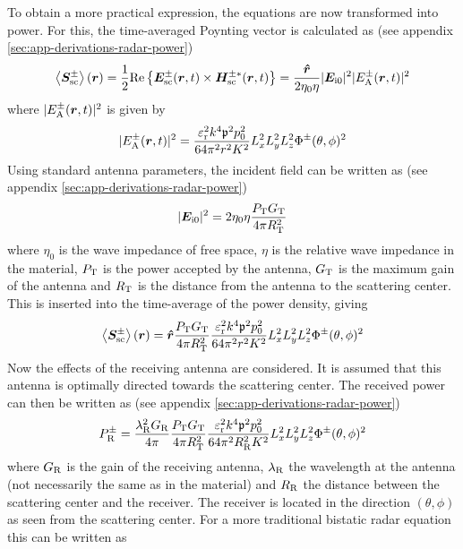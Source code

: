 \documentclass[11pt,twoside]{eitExjobb}
\begin{document}
	To obtain a more practical expression, the equations are now transformed into power. For this, the time-averaged Poynting vector is calculated as (see appendix \ref{sec:app-derivations-radar-power})
	\begin{equation*}
		\left< \bm{S}_{\mathrm{sc}}^\pm \right> (\bm{r}) = \frac{1}{2}\mathrm{Re}\left\{ \bm{E}_{\mathrm{sc}}^\pm (\bm{r},t) \times \bm{H}_{\mathrm{sc}}^{\pm*} (\bm{r},t) \right\} = \frac{\bm{\hat{r}}}{2\eta_0 \eta} |\bm{E}_{\mathrm{i}0}|^2 |E_{\mathrm{A}}^\pm (\bm{r},t)|^2
	\end{equation*}
	where $|E_{\mathrm{A}}^\pm (\bm{r},t)|^2$ is given by
	\begin{equation*}
		|E_{\mathrm{A}}^\pm (\bm{r},t)|^2 = \frac{\varepsilon_{\mathrm{r}}^2 k^4 \mathfrak{p}^2 p_0^2}{64\pi^2 r^2 K^2} L_{x}^2 L_{y}^2 L_{z}^2 \Phi^\pm (\theta,\phi)^2
	\end{equation*}
	Using standard antenna parameters, the incident field can be written as (see appendix \ref{sec:app-derivations-radar-power})
	\begin{equation*}
		|\bm{E}_{\mathrm{i}0}|^2 = 2\eta_0 \eta \frac{P_{\mathrm{T}} G_{\mathrm{T}}}{4\pi R_{\mathrm{T}}^2}
	\end{equation*}
	where $\eta_0$ is the wave impedance of free space, $\eta$ is the relative wave impedance in the material, $P_{\mathrm{T}}$ is the power accepted by the antenna, $G_{\mathrm{T}}$ is the maximum gain of the antenna and $R_{\mathrm{T}}$ is the distance from the antenna to the scattering center. This is inserted into the time-average of the power density, giving
	\begin{equation*}
		\left< \bm{S}_{\mathrm{sc}}^\pm \right> (\bm{r}) = \bm{\hat{r}} \frac{P_{\mathrm{T}} G_{\mathrm{T}}}{4\pi R_{\mathrm{T}}^2} \frac{\varepsilon_{\mathrm{r}}^2 k^4 \mathfrak{p}^2 p_0^2}{64\pi^2 r^2 K^2} L_{x}^2 L_{y}^2 L_{z}^2 \Phi^\pm (\theta,\phi)^2
	\end{equation*}
	Now the effects of the receiving antenna are considered. It is assumed that this antenna is optimally directed towards the scattering center. The received power can then be written as (see appendix \ref{sec:app-derivations-radar-power})
	\begin{equation*}
		P_{\mathrm{R}}^\pm = \frac{\lambda_{\mathrm{R}}^2 G_{\mathrm{R}}}{4\pi} \frac{P_{\mathrm{T}} G_{\mathrm{T}}}{4\pi R_{\mathrm{T}}^2} \frac{\varepsilon_{\mathrm{r}}^2 k^4 \mathfrak{p}^2 p_0^2}{64\pi^2 R_{\mathrm{R}}^2 K^2} L_{x}^2 L_{y}^2 L_{z}^2 \Phi^\pm (\theta,\phi)^2
	\end{equation*}
	where $G_{\mathrm{R}}$ is the gain of the receiving antenna, $\lambda_{\mathrm{R}}$ the wavelength at the antenna (not necessarily the same as in the material) and $R_{\mathrm{R}}$ the distance between the scattering center and the receiver. The receiver is located in the direction $(\theta,\phi)$ as seen from the scattering center. For a more traditional bistatic radar equation \cite{Richards2012} this can be written as
\end{document}
